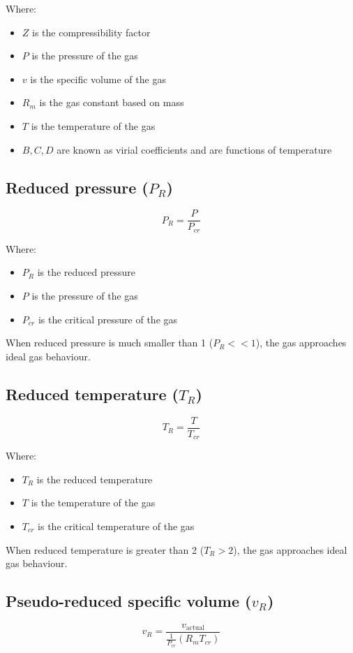 \documentclass[11pt]{article}
\begin{document}
Where:
\begin{itemize}
\item \(Z\) is the compressibility factor
\item \(P\) is the pressure of the gas
\item \(v\) is the specific volume of the gas
\item \(R_m\) is the gas constant based on mass
\item \(T\) is the temperature of the gas
\item \(B, C, D\) are known as virial coefficients and are functions of temperature
\end{itemize}

\subsection{Reduced pressure (\(P_R\))}
\label{sec:org7f107b8}
\[P_R = \frac{P}{P_{cr}}\]

Where:
\begin{itemize}
\item \(P_R\) is the reduced pressure
\item \(P\) is the pressure of the gas
\item \(P_{cr}\) is the critical pressure of the gas
\end{itemize}

When reduced pressure is much smaller than 1 (\(P_R << 1\)), the gas approaches ideal gas behaviour.

\subsection{Reduced temperature (\(T_R\))}
\label{sec:org6eea2a6}
\[T_R = \frac{T}{T_{cr}}\]

Where:
\begin{itemize}
\item \(T_R\) is the reduced temperature
\item \(T\) is the temperature of the gas
\item \(T_{cr}\) is the critical temperature of the gas
\end{itemize}

When reduced temperature is greater than 2 (\(T_R > 2\)), the gas approaches ideal gas behaviour.

\subsection{Pseudo-reduced specific volume (\(v_R\))}
\label{sec:org916fe60}
\[v_R = \frac{v_{\text{actual}}}{\frac{1}{P_{cr}} \left(R_m T_{cr} \right)}\]
\end{document}
